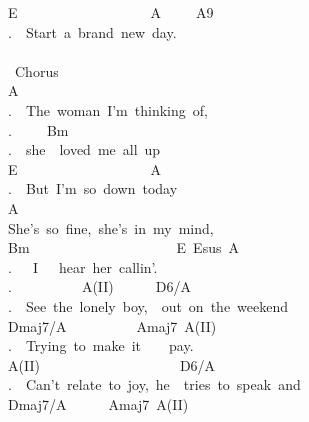 {E\ \ \ \ \ \ \ \ \ \ \ \ \ \ \ \ \ \ \ A\ \ \ \ \ A9\ \ \ \ \ \ \ \ \ \ \ \ \ \ \ \ \ \ \ \ \ \ \\
.\ \ Start\ a\ brand\ new\ day.\ \ \ \ \ \ \ \ \ \ \ \ \ \ \ \ \ \ \ \ \ \ \ \ \ \ \\
\ \ \\
\lbrack\ Chorus\rbrack\ \ \ \ \ \ \ \ \ \ \ \ \ \ \ \ \ \ \ \ \ \ \ \ \ \ \ \ \ \ \ \ \ \ \ \ \ \ \ \ \ \\
A\ \ \ \ \ \ \ \ \ \ \ \ \ \ \ \ \ \ \ \ \ \ \ \ \ \ \ \ \ \ \ \ \ \ \ \ \ \ \ \ \ \ \ \ \ \ \ \ \ \\
.\ \ The\ woman\ I'm\ thinking\ of,\ \ \ \ \ \ \ \ \ \ \ \ \ \ \ \ \ \ \ \ \ \ \\
.\ \ \ \ \ Bm\ \ \ \ \ \ \ \ \ \ \ \ \ \ \ \ \ \ \ \ \ \ \ \ \ \ \ \ \ \ \ \ \ \ \ \ \ \ \ \ \ \ \ \ \ \ \ \ \\
.\ \ she\ \ loved\ me\ all\ up\ \ \ \ \ \ \ \ \ \ \ \ \ \ \ \ \ \ \ \ \ \ \ \ \ \ \ \ \ \\
E\ \ \ \ \ \ \ \ \ \ \ \ \ \ \ \ \ \ \ A\ \ \ \ \ \ \ \ \ \ \ \ \ \ \ \ \ \ \ \ \ \ \ \ \ \ \ \ \ \\
.\ \ But\ I'm\ so\ down\ today\ \ \ \ \ \ \ \ \ \ \ \ \ \ \ \ \ \ \ \ \ \ \ \ \ \ \ \\
A\ \ \ \ \ \ \ \ \ \ \ \ \ \ \ \ \ \ \ \ \ \ \ \ \ \ \ \ \ \ \ \ \ \ \ \ \ \ \ \ \ \ \ \ \ \ \ \ \ \\
She's\ so\ fine,\ she's\ in\ my\ mind,\ \ \ \ \ \ \ \ \ \ \ \ \ \ \ \ \ \ \\
Bm\ \ \ \ \ \ \ \ \ \ \ \ \ \ \ \ \ \ \ \ \ E\ Esus\ A\ \ \ \ \ \ \ \ \ \ \ \ \ \ \ \ \ \ \ \ \\
.\ \ \ I\ \ \ hear\ her\ callin'.\ \ \ \ \ \ \ \ \ \ \ \ \ \ \ \ \ \ \ \ \ \ \ \ \ \ \ \ \ \\
.\ \ \ \ \ \ \ \ \ \ A(II)\ \ \ \ \ \ D6/A\ \ \ \ \ \ \ \ \ \ \ \ \ \ \ \ \ \ \ \ \ \ \ \ \ \\
.\ \ See\ the\ lonely\ boy,\ \ out\ on\ the\ weekend\ \ \ \ \ \ \ \ \ \\
Dmaj7/A\ \ \ \ \ \ \ \ \ \ Amaj7\ A(II)\ \ \ \ \ \ \ \ \ \ \ \ \ \ \ \ \ \ \ \ \ \ \\
.\ \ Trying\ to\ make\ it\ \ \ \ pay.\ \ \ \ \ \ \ \ \ \ \ \ \ \ \ \ \ \ \ \ \ \ \ \\
A(II)\ \ \ \ \ \ \ \ \ \ \ \ \ \ \ \ \ \ \ \ D6/A\ \ \ \ \ \ \ \ \ \ \ \ \ \ \ \ \ \ \ \ \ \\
.\ \ Can't\ relate\ to\ joy,\ he\ \ tries\ to\ speak\ and\ \ \ \ \ \\
Dmaj7/A\ \ \ \ \ \ Amaj7\ A(II)\ \ \ \ \ \ \ \ \ \ \ \ \ \ \ \ \ \ \ \ \ \ \ \ \ \ \\
}
